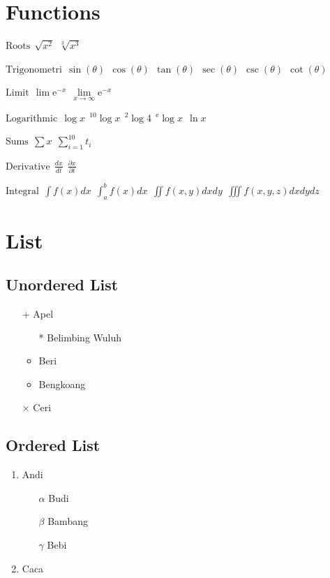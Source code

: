 \documentclass{article}
\begin{document}
    \newpage
    \section{Functions}

    $\textrm{Roots} \: \: \sqrt{x^2} \: \: 
    \sqrt[3]{x^3}
    $

    $\textrm{Trigonometri} \: \:
    \sin(\theta) \: \: 
    \cos(\theta) \: \: 
    \tan(\theta) \: \: 
    \sec(\theta) \: \:
    \csc(\theta) \: \:
    \cot(\theta) \: \:
    $

    $\textrm{Limit} \: \:
    \lim \textrm{e}^{-x} \: \:
    \lim\limits_{x \to \infty} \textrm{e}^{-x}
    $

    $\textrm{Logarithmic} \: \:
    \log{x} \: \: 
    ^{10} \log{x} \: \:
    ^{2} \log {4} \: \:
    ^{\textrm{e}} \log {x} \: \:
    \ln {x}
    $

    $\textrm{Sums} \: \:
    \sum x \: \:
    \sum_{i=1}^{10} t_i
    $

    $\textrm{Derivative} \: \:
    \frac{dx}{dt} \: \:
    \frac{\partial x}{\partial t}
    $

    $\textrm{Integral} \: \:
    \int f(x) dx \: \:
    \int_a^b f(x) dx \: \:
    \iint f(x, y) dx dy \: \:
    \iiint f(x, y, z) dx dy dz \: \:
    $

    \section{List}
    
    \subsection{Unordered List}
    \begin{itemize}
        \item[+] Apel
        \begin{itemize}
            \item[*] Belimbing Wuluh
            \item Beri
            \item Bengkoang
        \end{itemize}
        \item[$\times$] Ceri
    \end{itemize}

    \subsection{Ordered List}
    \begin{enumerate}
        \item Andi
        \begin{enumerate}
            \item[$\alpha$] Budi
            \item[$\beta$] Bambang
            \item[$\gamma$] Bebi
        \end{enumerate}
        \item Caca
    \end{enumerate}
\end{document}
